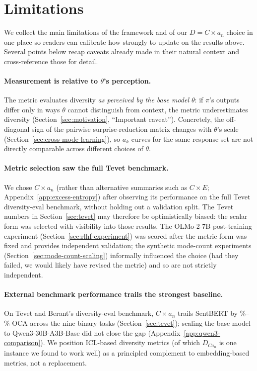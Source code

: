 \section{Limitations}\label{sec:limitations}

We collect the main limitations of the framework and of our $D = C \times a_n$ choice in one place so readers can calibrate how strongly to update on the results above.
Several points below recap caveats already made in their natural context and cross-reference those for detail.

\paragraph{Measurement is relative to $\theta$'s perception.}
The metric evaluates diversity \emph{as perceived by the base model $\theta$}: if $\pi$'s outputs differ only in ways $\theta$ cannot distinguish from context, the metric underestimates diversity (Section~\ref{sec:motivation}, ``Important caveat'').
Concretely, the off-diagonal sign of the pairwise surprise-reduction matrix changes with $\theta$'s scale (Section~\ref{sec:cross-mode-learning}), so $a_k$ curves for the same response set are not directly comparable across different choices of $\theta$.

\paragraph{Metric selection saw the full Tevet benchmark.}
We chose $C \times a_n$ (rather than alternative summaries such as $C \times E$; Appendix~\ref{app:excess-entropy}) after observing its performance on the full Tevet diversity-eval benchmark, without holding out a validation split.
The Tevet numbers in Section~\ref{sec:tevet} may therefore be optimistically biased: the scalar form was selected with visibility into those results.
The OLMo-2-7B post-training experiment (Section~\ref{sec:rlhf-experiment}) was scored after the metric form was fixed and provides independent validation; the synthetic mode-count experiments (Section~\ref{sec:mode-count-scaling}) informally influenced the choice (had they failed, we would likely have revised the metric) and so are not strictly independent.

\paragraph{External benchmark performance trails the strongest baseline.}
On Tevet and Berant's diversity-eval benchmark, $C \times a_n$ trails SentBERT by \tevetCxAnVsSentBertOCAMinPct\%--\tevetCxAnVsSentBertOCAMaxPct\% OCA across the nine binary tasks (Section~\ref{sec:tevet}); scaling the base model to Qwen3-30B-A3B-Base \citep{yang2025qwen3} did not close the gap (Appendix~\ref{app:qwen3-comparison}).
We position ICL-based diversity metrics (of which $D_{Ca_n}$ is one instance we found to work well) as a principled complement to embedding-based metrics, not a replacement.

